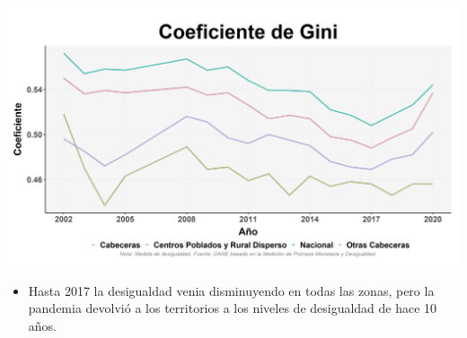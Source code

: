 \documentclass[aspectratio=169]{beamer}
\begin{document}
    \begin{slide}{5} 
            \begin{imagecolumn}
                \includegraphics[width=\columnwidth]{img/var_256_trend.png}
            \end{imagecolumn}
            \begin{textcolumn}
                \begin{itemize}
                    \item Hasta 2017 la desigualdad venia disminuyendo en todas las zonas, pero la pandemia devolvió a los territorios a los niveles de desigualdad de hace 10 años.
                \end{itemize}
            \end{textcolumn}

    \printcolumns
    \end{slide}
    
\end{document}
